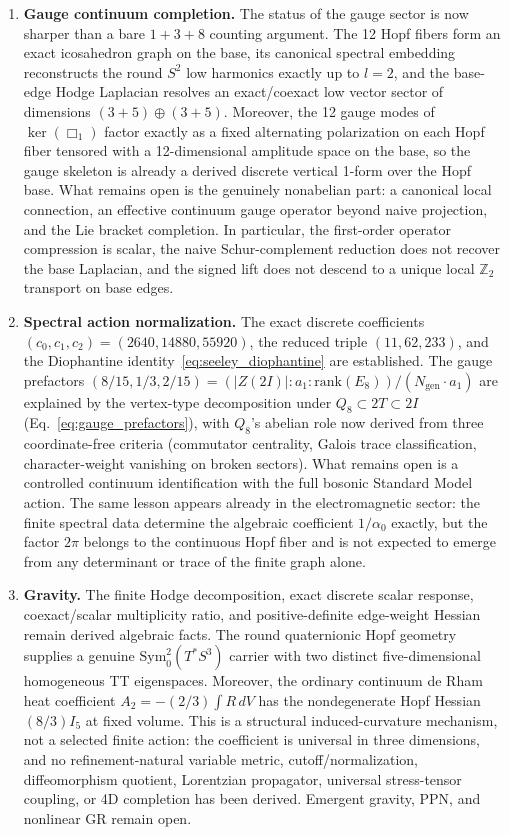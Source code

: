 \documentclass[12pt,a4paper]{article}
\theoremstyle{definition}
\begin{document}
\begin{enumerate}
\item \textbf{Gauge continuum completion.}  The status of the gauge sector is now sharper than a bare $1+3+8$ counting argument.  The 12 Hopf fibers form an exact icosahedron graph on the base, its canonical spectral embedding reconstructs the round $S^2$ low harmonics exactly up to $l=2$, and the base-edge Hodge Laplacian resolves an exact/coexact low vector sector of dimensions $(3+5)\oplus(3+5)$.  Moreover, the 12 gauge modes of $\ker(\Box_1)$ factor exactly as a fixed alternating polarization on each Hopf fiber tensored with a 12-dimensional amplitude space on the base, so the gauge skeleton is already a derived discrete vertical 1-form over the Hopf base.  What remains open is the genuinely nonabelian part: a canonical local connection, an effective continuum gauge operator beyond naive projection, and the Lie bracket completion.  In particular, the first-order operator compression is scalar, the naive Schur-complement reduction does not recover the base Laplacian, and the signed lift does not descend to a unique local $\mathbb{Z}_2$ transport on base edges.
\item \textbf{Spectral action normalization.} The exact discrete coefficients $(c_0,c_1,c_2) = (2640,14880,55920)$, the reduced triple $(11,62,233)$, and the Diophantine identity~\eqref{eq:seeley_diophantine} are established.  The gauge prefactors $(8/15,1/3,2/15) = (|Z(2I)| : a_1 : \mathrm{rank}(E_8))/(N_{\text{gen}} \cdot a_1)$ are explained by the vertex-type decomposition under $Q_8 \subset 2T \subset 2I$ (Eq.~\ref{eq:gauge_prefactors}), with $Q_8$'s abelian role now derived from three coordinate-free criteria (commutator centrality, Galois trace classification, character-weight vanishing on broken sectors).  What remains open is a controlled continuum identification with the full bosonic Standard Model action.  The same lesson appears already in the electromagnetic sector: the finite spectral data determine the algebraic coefficient $1/\alpha_0$ exactly, but the factor $2\pi$ belongs to the continuous Hopf fiber and is not expected to emerge from any determinant or trace of the finite graph alone.
\item \textbf{Gravity.} The finite Hodge decomposition, exact discrete scalar response, coexact/scalar multiplicity ratio, and positive-definite edge-weight Hessian remain derived algebraic facts.  The round quaternionic Hopf geometry supplies a genuine $\mathrm{Sym}^2_0(T^*S^3)$ carrier with two distinct five-dimensional homogeneous TT eigenspaces.  Moreover, the ordinary continuum de Rham heat coefficient $A_2=-(2/3)\int R\,dV$ has the nondegenerate Hopf Hessian $(8/3)I_5$ at fixed volume.  This is a structural induced-curvature mechanism, not a selected finite action: the coefficient is universal in three dimensions, and no refinement-natural variable metric, cutoff/normalization, diffeomorphism quotient, Lorentzian propagator, universal stress-tensor coupling, or 4D completion has been derived.  Emergent gravity, PPN, and nonlinear GR remain open.

\end{enumerate}
\end{document}
